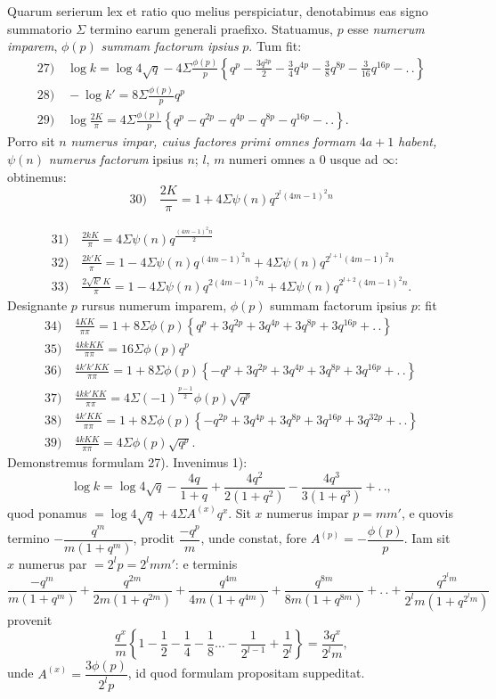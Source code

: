 \documentclass{article}
\begin{document}
Quarum serierum lex et ratio quo melius perspiciatur, denotabimus eas signo summatorio $\Sigma$ termino earum generali praefixo. Statuamus, $p$ esse \emph{numerum imparem}, $\phi(p)$ \emph{summam factorum ipsius} $p$. Tum fit:
\[
\begin{gathered}
\text{27)}\quad\log k=\log4\sqrt{q}-4\Sigma\frac{\phi(p)}{p}\left\{q^{p}-\frac{3q^{2p}}{2}-\frac{3}{4}q^{4p}-\frac{3}{8}q^{8p}-\frac{3}{16}q^{16p}-.\,.\right\}\\[2ex]
\text{28)}\quad-\log k'=8\Sigma\frac{\phi(p)}{p}q^{p}\\[2ex]
\text{29)}\quad\log\frac{2K}{\pi}=4\Sigma\frac{\phi(p)}{p}\left\{q^{p}-q^{2p}-q^{4p}-q^{8p}-q^{16p}-.\,.\right\}.
\end{gathered}
\]
Porro sit $n$ \emph{numerus impar, cuius factores primi omnes formam} $4a+1$ \emph{habent,} $\psi(n)$ \emph{numerus factorum} ipsius $n$; $l$, $m$ numeri omnes a $0$ usque ad $\infty$: obtinemus:
\[
\text{30)}\quad\frac{2K}{\pi}=1+4\Sigma\psi(n)q^{2^{l}(4m-1)^{2}n}
\]

\[
\begin{gathered}
\text{31)}\quad\frac{2kK}{\pi}=4\Sigma\psi(n)q^{\frac{(4m-1)^{2}n}{2}}\\[2ex]
\text{32)}\quad\frac{2k'K}{\pi}=1-4\Sigma\psi(n)q^{(4m-1)^{2}n}+4\Sigma\psi(n)q^{2^{l+1}(4m-1)^{2}n}\\[2ex]
\text{33)}\quad\frac{2\sqrt{k'}K}{\pi}=1-4\Sigma\psi(n)q^{2(4m-1)^{2}n}+4\Sigma\psi(n)q^{2^{l+2}(4m-1)^{2}n}.
\end{gathered}
\]
Designante $p$ rursus numerum imparem, $\phi(p)$ summam factorum ipsius $p$: fit
\[
\begin{gathered}
\text{34)}\quad\frac{4KK}{\pi\pi}=1+8\Sigma\phi(p)\left\{q^{p}+3q^{2p}+3q^{4p}+3q^{8p}+3q^{16p}+.\,.\right\}\\[2ex]
\text{35)}\quad\frac{4kkKK}{\pi\pi}=16\Sigma\phi(p)q^{p}\\[2ex]
\text{36)}\quad\frac{4k'k'KK}{\pi\pi}=1+8\Sigma\phi(p)\left\{-q^{p}+3q^{2p}+3q^{4p}+3q^{8p}+3q^{16p}+.\,.\right\}\\[2ex]
\text{37)}\quad\frac{4kk'KK}{\pi\pi}=4\Sigma(-1)^{\frac{p-1}{2}}\phi(p)\sqrt{q^{p}}\\[2ex]
\text{38)}\quad\frac{4k'KK}{\pi\pi}=1+8\Sigma\phi(p)\left\{-q^{2p}+3q^{4p}+3q^{8p}+3q^{16p}+3q^{32p}+.\,.\right\}\\[2ex]
\text{39)}\quad\frac{4kKK}{\pi\pi}=4\Sigma\phi(p)\sqrt{q^{p}}.
\end{gathered}
\]
Demonstremus formulam 27). Invenimus 1):
\[
\log k=\log4\sqrt{q}-\frac{4q}{1+q}+\frac{4q^{2}}{2(1+q^{2})}-\frac{4q^{3}}{3(1+q^{3})}+.\,.,
\]
quod ponamus $=\log4\sqrt{q}+4\Sigma A^{(x)}q^{x}$. Sit $x$ numerus impar $p=mm'$, e quovis termino $-\dfrac{q^{m}}{m(1+q^{m})}$, prodit $\dfrac{-q^{p}}{m}$, unde constat, fore $A^{(p)}=-\dfrac{\phi(p)}{p}$. Iam sit $x$ numerus par $=2^{l}p=2^{l}mm'$: e terminis
\[
\frac{-q^{m}}{m(1+q^{m})}+\frac{q^{2m}}{2m(1+q^{2m})}+\frac{q^{4m}}{4m(1+q^{4m})}+\frac{q^{8m}}{8m(1+q^{8m})}+.\,.+\frac{q^{2^{l}m}}{2^{l}m(1+q^{2^{l}m})}
\]
provenit
\[
\frac{q^{x}}{m}\left\{1-\frac{1}{2}-\frac{1}{4}-\frac{1}{8}\ldots-\frac{1}{2^{l-1}}+\frac{1}{2^{l}}\right\}=\frac{3q^{x}}{2^{l}m},
\]
unde $A^{(x)}=\dfrac{3\phi(p)}{2^{l}p}$, id quod formulam propositam suppeditat.
\end{document}
